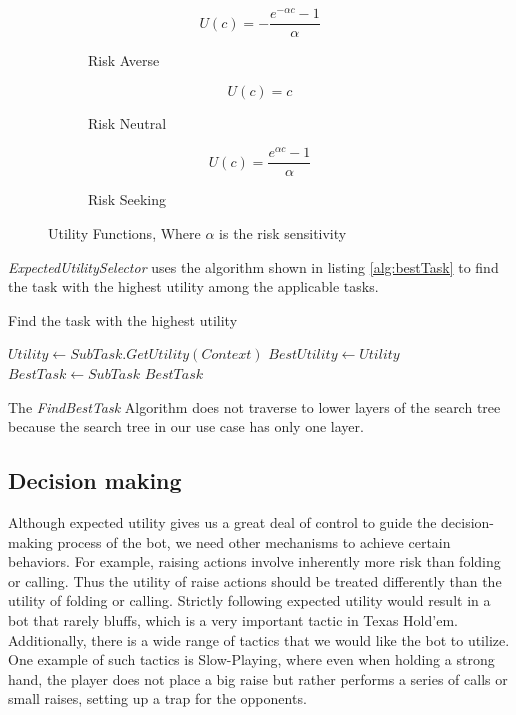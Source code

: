 \begin{figure}[h]
    \centering
    \begin{subfigure}[b]{0.33\textwidth}
        \centering
        $$U(c)= - \frac{e^{-\alpha c} -1}{\alpha}$$
        \caption{Risk Averse}
        \label{fig:riskaverse}
    \end{subfigure}
    \begin{subfigure}[b]{0.33\textwidth}
        \centering
        $$U(c)= c$$
        \caption{Risk Neutral}
        \label{fig:riskneutral}
    \end{subfigure}
    \begin{subfigure}[b]{0.33\textwidth}
        \centering
        $$U(c)= \frac{e^{\alpha c} -1}{\alpha}$$
        \caption{Risk Seeking}
        \label{fig:riskseeking}
    \end{subfigure}
    \caption{Utility Functions, Where $\alpha$ is the risk sensitivity}
    \label{fig:utilityfunctions}
\end{figure}

\textit{ExpectedUtilitySelector} uses the algorithm shown in listing \ref{alg:bestTask} to find the task with the highest utility among the applicable tasks.


\begin{Algorithmus}[H]
    \caption{Find the task with the highest utility}
    \label{alg:bestTask}
    \begin{algorithmic}
                    \State $Utility \gets SubTask.GetUtility(Context)$
                        \State $BestUtility \gets Utility$
                        \State $BestTask \gets SubTask$
                    \EndIf
                \EndIf
            \EndFor
            \State \Return $BestTask$
        \EndProcedure
    \end{algorithmic}
\end{Algorithmus}

The \textit{FindBestTask} Algorithm does not traverse to lower layers of the search tree because the search tree in our use case has only one layer.

\subsection{Decision making}

Although expected utility gives us a great deal of control to guide the decision-making process of the bot, we need other mechanisms to achieve certain behaviors. For example, raising actions involve inherently more risk than folding or calling. Thus the utility of raise actions should be treated differently than the utility of folding or calling. 
Strictly following expected utility would result in a bot that rarely bluffs, which is a very important tactic in Texas Hold'em. Additionally, there is a wide range of tactics that we would like the bot to utilize. One example of such tactics is Slow-Playing, where even when holding a strong hand, the player does not place a big raise but rather performs a series of calls or small raises, setting up a trap for the opponents. 

